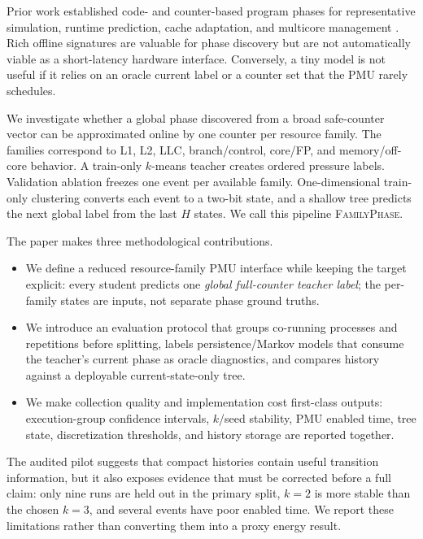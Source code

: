 \documentclass[conference,10pt]{IEEEtran}
\newcommand{\system}{\textsc{FamilyPhase}}
\begin{document}
Prior work established code- and counter-based program phases for representative
simulation, runtime prediction, cache adaptation, and multicore management
\cite{sherwood2001bbda,sherwood2002simpoint,sherwood2003phase,perelman2006parallel,
nomani2015predicting,lozano2022phase}. Rich offline signatures are valuable for phase
discovery but are not automatically viable as a short-latency hardware interface.
Conversely, a tiny model is not useful if it relies on an oracle current label or a
counter set that the PMU rarely schedules.

We investigate whether a global phase discovered from a broad safe-counter vector can
be approximated online by one counter per resource family. The families correspond to
L1, L2, LLC, branch/control, core/FP, and memory/off-core behavior. A train-only
$k$-means teacher creates ordered pressure labels. Validation ablation freezes one
event per available family. One-dimensional train-only clustering converts each event
to a two-bit state, and a shallow tree predicts the next global label from the last
$H$ states. We call this pipeline \system.

The paper makes three methodological contributions.

\begin{itemize}
  \item We define a reduced resource-family PMU interface while keeping the target
  explicit: every student predicts one \emph{global full-counter teacher label}; the
  per-family states are inputs, not separate phase ground truths.
  \item We introduce an evaluation protocol that groups co-running processes and
  repetitions before splitting, labels persistence/Markov models that consume the
  teacher's current phase as oracle diagnostics, and compares history against a
  deployable current-state-only tree.
  \item We make collection quality and implementation cost first-class outputs:
  execution-group confidence intervals, $k$/seed stability, PMU enabled time, tree
  state, discretization thresholds, and history storage are reported together.
\end{itemize}

The audited pilot suggests that compact histories contain useful transition
information, but it also exposes evidence that must be corrected before a full claim:
only nine runs are held out in the primary split, $k=2$ is more stable than the chosen
$k=3$, and several events have poor enabled time. We report these limitations rather
than converting them into a proxy energy result.
\end{document}
